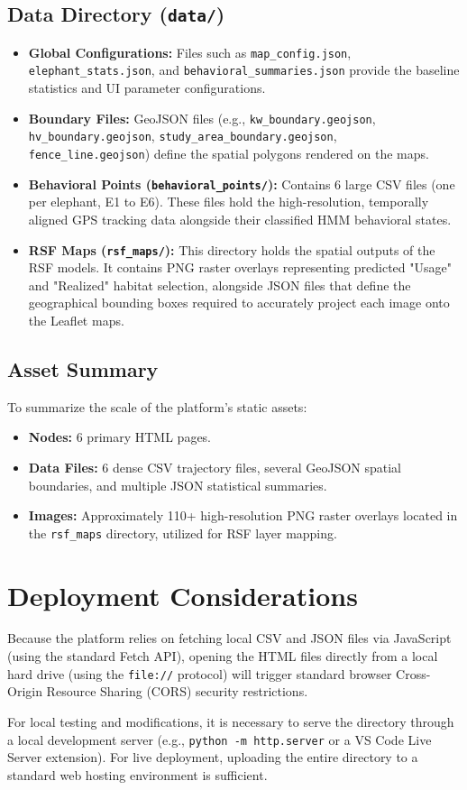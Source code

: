 \documentclass[12pt]{article}
\begin{document}
\subsection{Data Directory (\texttt{data/})}
\begin{itemize}
    \item \textbf{Global Configurations:} Files such as \texttt{map\_config.json}, \texttt{elephant\_stats.json}, and \texttt{behavioral\_summaries.json} provide the baseline statistics and UI parameter configurations.
    \item \textbf{Boundary Files:} GeoJSON files (e.g., \texttt{kw\_boundary.geojson}, \texttt{hv\_boundary.geojson}, \texttt{study\_area\_boundary.geojson}, \texttt{fence\_line.geojson}) define the spatial polygons rendered on the maps.
    \item \textbf{Behavioral Points (\texttt{behavioral\_points/}):} Contains 6 large CSV files (one per elephant, E1 to E6). These files hold the high-resolution, temporally aligned GPS tracking data alongside their classified HMM behavioral states.
    \item \textbf{RSF Maps (\texttt{rsf\_maps/}):} This directory holds the spatial outputs of the RSF models. It contains PNG raster overlays representing predicted "Usage" and "Realized" habitat selection, alongside JSON files that define the geographical bounding boxes required to accurately project each image onto the Leaflet maps.
\end{itemize}

\subsection{Asset Summary}
To summarize the scale of the platform's static assets:
\begin{itemize}
    \item \textbf{Nodes:} 6 primary HTML pages.
    \item \textbf{Data Files:} 6 dense CSV trajectory files, several GeoJSON spatial boundaries, and multiple JSON statistical summaries.
    \item \textbf{Images:} Approximately 110+ high-resolution PNG raster overlays located in the \texttt{rsf\_maps} directory, utilized for RSF layer mapping.
\end{itemize}

\section{Deployment Considerations}
Because the platform relies on fetching local CSV and JSON files via JavaScript (using the standard Fetch API), opening the HTML files directly from a local hard drive (using the \texttt{file://} protocol) will trigger standard browser Cross-Origin Resource Sharing (CORS) security restrictions. 

For local testing and modifications, it is necessary to serve the directory through a local development server (e.g., \texttt{python -m http.server} or a VS Code Live Server extension). For live deployment, uploading the entire directory to a standard web hosting environment is sufficient.
\end{document}
